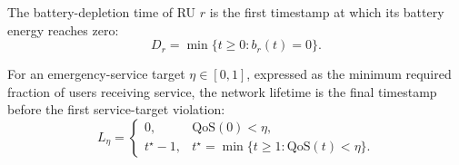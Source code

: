 The battery-depletion time of RU \(r\) is the first timestamp at which its battery energy reaches zero:
\begin{equation}
 D_r=\min\{t\geq0:b_r(t)=0\}.
\end{equation}

For an emergency-service target \(\eta\in[0,1]\), expressed as the minimum required fraction of users receiving service, the network lifetime is the final timestamp before the first service-target violation:
\begin{equation}
 L_\eta=\begin{cases}
 0, & \mathrm{QoS}(0)<\eta,\\
 t^\star-1, & t^\star=\min\{t\geq1:\mathrm{QoS}(t)<\eta\}.
 \end{cases}
\end{equation}
